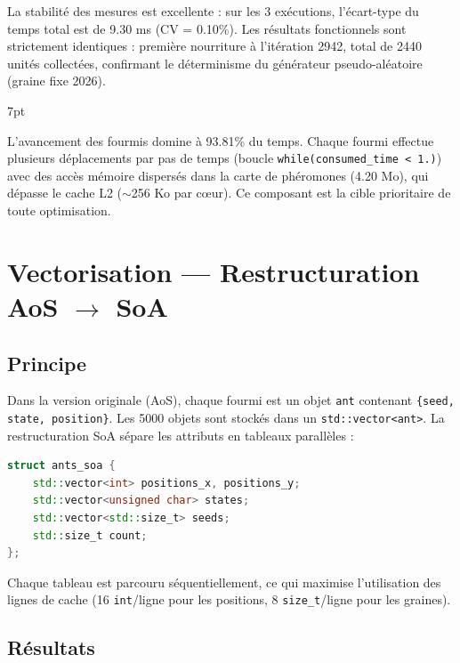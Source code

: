 \documentclass[11pt,a4paper]{article}
\newenvironment{formal}{%
  \def\FrameCommand{%
    \hspace{1pt}%
    {\color{enstaBleuFonce}\vrule width 2pt}%
    {\color{formalshade}\vrule width 4pt}%
    \colorbox{formalshade}%
  }%
  \MakeFramed{\advance\hsize-\width\FrameRestore}%
  \noindent\hspace{-4.55pt}%
  \begin{adjustwidth}{}{7pt}%
  \vspace{2pt}\vspace{2pt}%
}
{%
  \vspace{6pt}\end{adjustwidth}\endMakeFramed%
}
\begin{document}
La stabilité des mesures est excellente : sur les 3 exécutions, l'écart-type du temps total est de 9.30 ms (CV = 0.10\%). Les résultats fonctionnels sont strictement identiques : première nourriture à l'itération 2942, total de 2440 unités collectées, confirmant le déterminisme du générateur pseudo-aléatoire (graine fixe 2026).

\begin{formal}
L'avancement des fourmis domine à 93.81\% du temps. Chaque fourmi effectue plusieurs déplacements par pas de temps (boucle \texttt{while(consumed\_time < 1.)}) avec des accès mémoire dispersés dans la carte de phéromones (4.20 Mo), qui dépasse le cache L2 ($\sim$256 Ko par c\oe ur). Ce composant est la cible prioritaire de toute optimisation.
\end{formal}

\newpage
\section{Vectorisation --- Restructuration AoS $\to$ SoA}

\subsection{Principe}

Dans la version originale (AoS), chaque fourmi est un objet \texttt{ant} contenant \texttt{\{seed, state, position\}}. Les 5000 objets sont stockés dans un \texttt{std::vector<ant>}. La restructuration SoA sépare les attributs en tableaux parallèles :

\begin{lstlisting}[language=C++, caption={Structure SoA}]
struct ants_soa {
    std::vector<int> positions_x, positions_y;
    std::vector<unsigned char> states;
    std::vector<std::size_t> seeds;
    std::size_t count;
};
\end{lstlisting}

Chaque tableau est parcouru séquentiellement, ce qui maximise l'utilisation des lignes de cache (16 \texttt{int}/ligne pour les positions, 8 \texttt{size\_t}/ligne pour les graines).

\subsection{Résultats}
\end{document}
